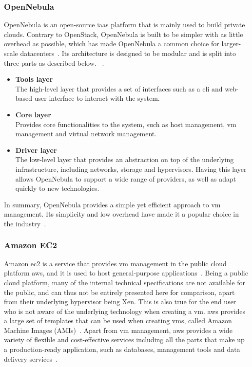 \documentclass{kththesis}
\begin{document}
\subsubsection*{OpenNebula}
OpenNebula is an open-source \Gls{iaas} platform that is mainly used to build private clouds. Contrary to OpenStack, OpenNebula is built to be simpler with as little overhead as possible, which has made OpenNebula a common choice for larger-scale datacenters\ \cite{openstack-opennebula-comparison}. Its architecture is designed to be modular and is split into three parts as described below. \ \cite{openenbula-tele-teaching, iaas-comparisons}.
\begin{itemize}
    \item \textbf{Tools layer}\\The high-level layer that provides a set of interfaces such as a \Gls{cli} and web-based user interface to interact with the system.
    \item \textbf{Core layer}\\Provides core functionalities to the system, such as host management, \Gls{vm} management and virtual network management.
    \item \textbf{Driver layer}\\The low-level layer that provides an abstraction on top of the underlying infrastructure, including networks, storage and hypervisors. Having this layer allows OpenNebula to support a wide range of providers, as well as adapt quickly to new technologies.
\end{itemize}

In summary, OpenNebula provides a simple yet efficient approach to \Gls{vm} management. Its simplicity and low overhead have made it a popular choice in the industry\ \cite{opennebula-website}.

\subsubsection*{Amazon EC2}
Amazon \Gls{ec2} is a service that provides \Gls{vm} management in the public cloud platform \Gls{aws}, and it is used to host general-purpose applications\ \cite{ec2-overview, ec2-overview-web}. Being a public cloud platform, many of the internal technical specifications are not available for the public, and can thus not be entirely presented here for comparison, apart from their underlying hypervisor being Xen. This is also true for the end user who is not aware of the underlying technology when creating a \Gls{vm}. \Gls{aws} provides a large set of templates that can be used when creating \Glspl{vm}, called  Amazon Machine Images (AMIs)\ \cite{ec2-overview}. Apart from \Gls{vm} management, \Gls{aws} provides a wide variety of flexible and cost-effective services including all the parts that make up a production-ready application, such as databases, management tools and data delivery services\ \cite{azure-aws-gcp-comparison}. 
\end{document}
